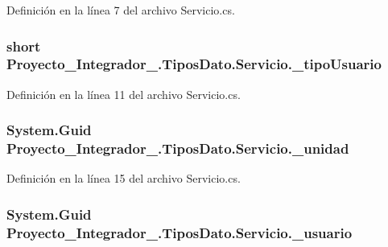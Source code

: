 Definición en la línea 7 del archivo Servicio.\-cs.

\hypertarget{class_proyecto___integrador__3_1_1_tipos_dato_1_1_servicio_a2787eb24fd380da2cd0abe7b0e87ce2e}{
\subsubsection[{\-\_\-tipo\-Usuario}]{\setlength{\rightskip}{0pt plus 5cm}short Proyecto\-\_\-\-Integrador\-\_.\-Tipos\-Dato.\-Servicio.\-\_\-tipo\-Usuario\hspace{0.3cm}{\ttfamily [private]}}}\label{class_proyecto___integrador__3_1_1_tipos_dato_1_1_servicio_a2787eb24fd380da2cd0abe7b0e87ce2e}


Definición en la línea 11 del archivo Servicio.\-cs.

\hypertarget{class_proyecto___integrador__3_1_1_tipos_dato_1_1_servicio_a4963d49bd3ca49ff2223c7a37469a23f}{
\subsubsection[{\-\_\-unidad}]{\setlength{\rightskip}{0pt plus 5cm}System.\-Guid Proyecto\-\_\-\-Integrador\-\_.\-Tipos\-Dato.\-Servicio.\-\_\-unidad\hspace{0.3cm}{\ttfamily [private]}}}\label{class_proyecto___integrador__3_1_1_tipos_dato_1_1_servicio_a4963d49bd3ca49ff2223c7a37469a23f}


Definición en la línea 15 del archivo Servicio.\-cs.

\hypertarget{class_proyecto___integrador__3_1_1_tipos_dato_1_1_servicio_aea0939faf5d7273f1cb5a9cf7fd88896}{
\subsubsection[{\-\_\-usuario}]{\setlength{\rightskip}{0pt plus 5cm}System.\-Guid Proyecto\-\_\-\-Integrador\-\_.\-Tipos\-Dato.\-Servicio.\-\_\-usuario\hspace{0.3cm}{\ttfamily [private]}}}\label{class_proyecto___integrador__3_1_1_tipos_dato_1_1_servicio_aea0939faf5d7273f1cb5a9cf7fd88896}


